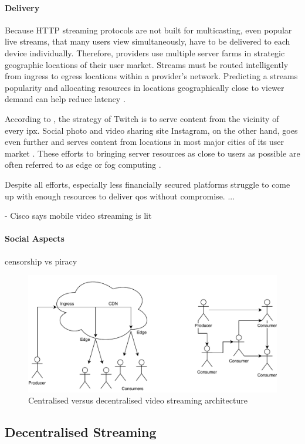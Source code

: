 \paragraph{Delivery}
Because HTTP streaming protocols are not built for multicasting, even popular live streams, that many users view simultaneously, have to be delivered to each device individually. Therefore, providers use multiple server farms \cite{TODO-network-book} in strategic geographic locations of their user market. Streams must be routed intelligently from ingress to egress locations within a provider's network. Predicting a streams popularity and allocating resources in locations geographically close to viewer demand can help reduce latency \cite{TODO}.

According to \citet{TODO}, the strategy of Twitch is to serve content from the vicinity of every \gls{ipx}. Social photo and video sharing site Instagram, on the other hand, goes even further and serves content from locations in most major cities of its user market \citet{TODO}. These efforts to bringing server resources as close to users as possible are often referred to as edge or fog computing \cite{fog-computing, object-store-fog-edge-ipfs}.

Despite all efforts, especially less financially secured platforms struggle to come up with enough resources to deliver \gls{qos} without compromise.
...

- Cisco says mobile video streaming is lit

\paragraph{Social Aspects}
censorship vs piracy

\begin{figure}
\centering
\includegraphics[width=.5\textwidth]{graphics/streaming-types.pdf}
\caption{Centralised versus decentralised video streaming architecture}
\label{fig:pipeline}
\end{figure}

\subsection{Decentralised Streaming}

